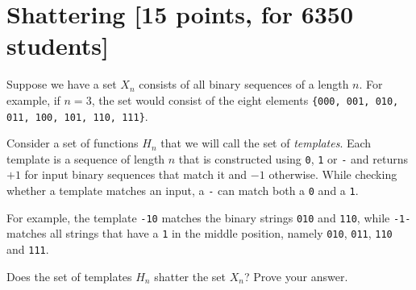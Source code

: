 \section{Shattering [15 points, for 6350 students]}
\label{sec:shattering}

Suppose we have a set $X_n$ consists of all binary sequences of a length $n$.
For example, if $n=3$, the set would consist of the eight elements
\texttt{\{000, 001, 010, 011, 100, 101, 110, 111\}}.

Consider a set of functions $H_n$ that we will call the set of {\em
  templates}. Each template is a sequence of length $n$ that is constructed
using {\tt 0}, {\tt 1} or {\tt -} and returns $+1$ for input binary sequences
that match it and $-1$ otherwise. While checking whether a template matches an
input, a {\tt -} can match both a {\tt 0} and a {\tt 1}.

For example, the template {\tt -10} matches the binary strings {\tt 010} and
{\tt 110}, while {\tt -1-} matches all strings that have a {\tt 1} in the middle
position, namely {\tt 010}, {\tt 011}, {\tt 110} and {\tt 111}.

Does the set of templates $H_n$ shatter the set $X_n$? Prove your answer.

